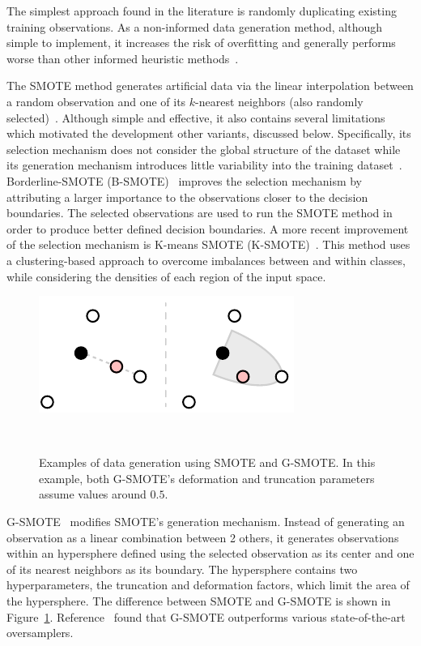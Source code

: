 \documentclass[preprint, 12pt]{elsarticle}
\begin{document}
The simplest approach found in the literature is randomly duplicating existing
training observations. As a non-informed data generation method, although
simple to implement, it increases the risk of overfitting and generally
performs worse than other informed heuristic
methods~\cite{Douzas2019imbalanced}.

The SMOTE method generates artificial data via the linear interpolation
between a random observation and one of its $k$-nearest neighbors (also
randomly selected)~\cite{Chawla2002}. Although simple and effective, it also
contains several limitations which motivated the development other variants,
discussed below. Specifically, its selection mechanism does not consider the
global structure of the dataset while its generation mechanism introduces
little variability into the training dataset~\cite{Douzas2019}.
Borderline-SMOTE (B-SMOTE)~\cite{Han2005} improves the selection mechanism by
attributing a larger importance to the observations closer to the decision
boundaries. The selected observations are used to run the SMOTE method in
order to produce better defined decision boundaries. A more recent improvement
of the selection mechanism is K-means SMOTE (K-SMOTE)~\cite{Douzas2018}. This
method uses a clustering-based approach to overcome imbalances between and
within classes, while considering the densities of each region of the input
space.

\begin{figure}[H]
	\centering
	\includegraphics[width=.45\linewidth]{../analysis/smote_vs_gsmote}
    \caption{%
        Examples of data generation using SMOTE and G-SMOTE\@. In this
        example, both G-SMOTE's deformation and truncation parameters assume
        values around $0.5$.
    }~\label{fig:smote_vs_gsmote}
\end{figure}

G-SMOTE~\cite{Douzas2019} modifies SMOTE's generation mechanism. Instead of
generating an observation as a linear combination between 2 others, it
generates observations within an hypersphere defined using the selected
observation as its center and one of its nearest neighbors as its boundary.
The hypersphere contains two hyperparameters, the truncation and deformation
factors, which limit the area of the hypersphere. The difference between SMOTE
and G-SMOTE is shown in Figure~\ref{fig:smote_vs_gsmote}.
Reference~\cite{Douzas2019imbalanced} found that G-SMOTE outperforms various
state-of-the-art oversamplers.
 
\end{document}

